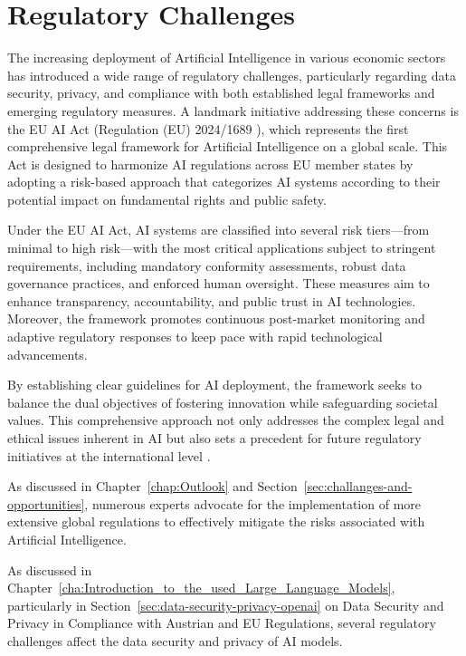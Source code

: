 \cite{AiAutomation}
\cite{AIAutomation2}

\section{Regulatory Challenges}
\label{sec:regulatory-challanges}

The increasing deployment of Artificial Intelligence in various economic sectors has introduced a wide range of regulatory challenges, particularly regarding data security, privacy, and compliance with both established legal frameworks and emerging regulatory measures. A landmark initiative addressing these concerns is the EU AI Act (Regulation (EU) 2024/1689 \cite{EU-AI-Act-text}), which represents the first comprehensive legal framework for Artificial Intelligence on a global scale. This Act is designed to harmonize AI regulations across EU member states by adopting a risk-based approach that categorizes AI systems according to their potential impact on fundamental rights and public safety.

Under the EU AI Act, AI systems are classified into several risk tiers—from minimal to high risk—with the most critical applications subject to stringent requirements, including mandatory conformity assessments, robust data governance practices, and enforced human oversight. These measures aim to enhance transparency, accountability, and public trust in AI technologies. Moreover, the framework promotes continuous post-market monitoring and adaptive regulatory responses to keep pace with rapid technological advancements.

By establishing clear guidelines for AI deployment, the framework seeks to balance the dual objectives of fostering innovation while safeguarding societal values. This comprehensive approach not only addresses the complex legal and ethical issues inherent in AI but also sets a precedent for future regulatory initiatives at the international level \cite{EURegFrameworkAI}.

As discussed in Chapter~\ref{chap:Outlook} and Section~\ref{sec:challanges-and-opportunities}, numerous experts advocate for the implementation of more extensive global regulations to effectively mitigate the risks associated with Artificial Intelligence.


As discussed in Chapter~\ref{cha:Introduction_to_the_used_Large_Language_Models}, particularly in Section~\ref{sec:data-security-privacy-openai} on Data Security and Privacy in Compliance with Austrian and EU Regulations, several regulatory challenges affect the data security and privacy of AI models.

